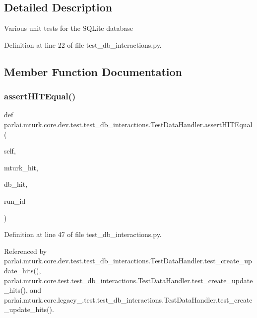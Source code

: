 \subsection{Detailed Description}
\begin{DoxyVerb}Various unit tests for the SQLite database\end{DoxyVerb}
 

Definition at line 22 of file test\+\_\+db\+\_\+interactions.\+py.



\subsection{Member Function Documentation}
\mbox{\label{classparlai_1_1mturk_1_1core_1_1dev_1_1test_1_1test__db__interactions_1_1TestDataHandler_afcc6cc8e2f9e340c656500ca88aaceec}} 
\subsubsection{\texorpdfstring{assert\+H\+I\+T\+Equal()}{assertHITEqual()}}
{\footnotesize\ttfamily def parlai.\+mturk.\+core.\+dev.\+test.\+test\+\_\+db\+\_\+interactions.\+Test\+Data\+Handler.\+assert\+H\+I\+T\+Equal (\begin{DoxyParamCaption}\item[{}]{self,  }\item[{}]{mturk\+\_\+hit,  }\item[{}]{db\+\_\+hit,  }\item[{}]{run\+\_\+id }\end{DoxyParamCaption})}



Definition at line 47 of file test\+\_\+db\+\_\+interactions.\+py.



Referenced by parlai.\+mturk.\+core.\+dev.\+test.\+test\+\_\+db\+\_\+interactions.\+Test\+Data\+Handler.\+test\+\_\+create\+\_\+update\+\_\+hits(), parlai.\+mturk.\+core.\+test.\+test\+\_\+db\+\_\+interactions.\+Test\+Data\+Handler.\+test\+\_\+create\+\_\+update\+\_\+hits(), and parlai.\+mturk.\+core.\+legacy\+\_.\+test.\+test\+\_\+db\+\_\+interactions.\+Test\+Data\+Handler.\+test\+\_\+create\+\_\+update\+\_\+hits().

